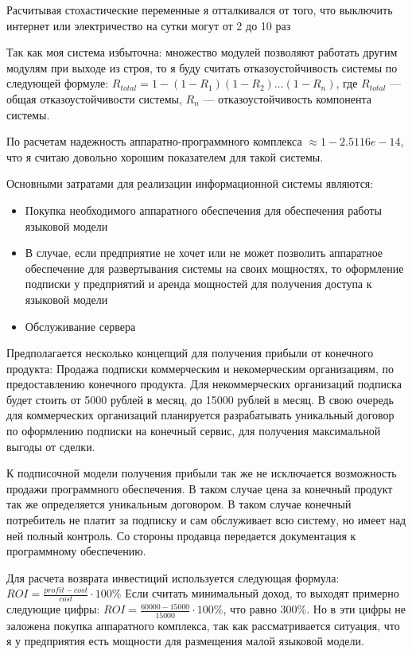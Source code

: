 Расчитывая стохастические переменные я отталкивался от того, что выключить
интернет или электричество на сутки могут от 2 до 10 раз

Так как моя система избыточна: множество модулей позволяют работать другим
модулям при выходе из строя, то я буду считать отказоустойчивость системы по
следующей формуле: $R_{total} = 1 - (1 - R_1)(1 - R_2)\ldots(1 - R_n)$, где 
$R_{total}$ --- общая отказоустойчивости системы, $R_n$ --- отказоустойчивость
компонента системы. 

По расчетам надежность аппаратно-программного комплекса
$\approx 1 - 2.5116e-14$, что я считаю довольно хорошим показателем для
такой системы.


Основными затратами для реализации информационной системы являются:

\begin{itemize}
\item Покупка необходимого аппаратного обеспечения для обеспечения работы
    языковой модели
\item В случае, если предприятие не хочет или не может позволить аппаратное 
    обеспечение для развертывания системы на своих мощностях, то оформление 
    подписки у предприятий и аренда мощностей для получения доступа к языковой 
    модели
\item Обслуживание сервера
\end{itemize}

Предполагается несколько концепций для получения прибыли от конечного продукта:
Продажа подписки коммерческим и некомерческим организациям, по предоставлению 
конечного продукта. Для некоммерческих организаций подписка будет стоить от 
5000 рублей в месяц, до 15000 рублей в месяц. В свою очередь для коммерческих
организаций планируется разрабатывать уникальный договор по оформлению подписки
на конечный сервис, для получения максимальной выгоды от сделки.

К подписочной модели получения прибыли так же не исключается возможность продажи
программного обеспечения. В таком случае цена за конечный продукт так же 
определяется уникальным договором. В таком случае конечный потребитель не 
платит за подписку и сам обслуживает всю систему, но имеет над ней полный 
контроль. Со стороны продавца передается документация к программному обеспечению.

Для расчета возврата инвестиций используется следующая формула: 
$ROI = \frac{profit - cost}{cost} \cdot 100\%$
Если считать минимальный доход, то выходят примерно следующие цифры:
$ROI = \frac{60000 - 15000}{15000} \cdot 100\%$,
что равно $300\%$. Но в эти цифры не заложена покупка аппаратного комплекса, 
так как рассматривается ситуация, что я у предприятия есть мощности для 
размещения малой языковой модели.

